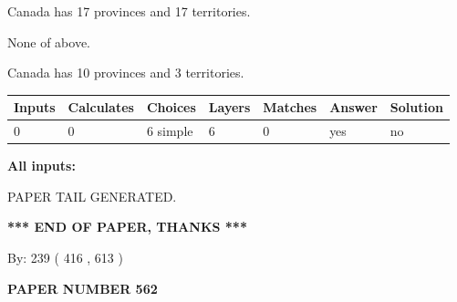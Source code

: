 \documentclass[12pt]{article}
\begin{document}
 
Canada has  17 provinces and  17 territories.
 
 
 None of above.
 
 
\noindent{}
 
 
Canada has 10  provinces and 3 territories.
 
 
\noindent{}
 
 
   
   
   
   
\noindent\begin{tabular}{|l|l|l|l|l|l|l|}
 \hline
Inputs & Calculates & Choices & Layers & Matches & Answer & Solution \\ \hline
 0  & 
 0  & 
 6
  simple  
  & 
 6  & 
 0  & 
  yes & 
  no 
  \\ \hline
 \end{tabular}
   
   
   
   
\noindent{}
   
   
   
   
\noindent\vspace{0.1in}\hspace{-0.08in} {\textbf{\Large{All inputs: }}}
   
   
   
   
   
   
 \vspace{0.2in}
 
   
   
\vspace{2.0in} PAPER TAIL GENERATED.
   
   
   
   
\vspace{1.0in} 
{\textbf{\large{ *** END OF PAPER, THANKS *** }}} 
   
   
\hspace{1.0in} By: 
 239 ( 416 ,  613 )
   
   
   
   
\newpage 
\setcounter{page}{ 
   562001 } 
   
   
   
   
 {\textbf{ \Large{ PAPER NUMBER  562  }}}
   
\end{document}
